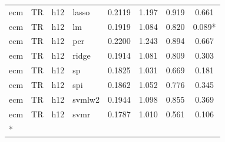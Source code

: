 \begin{ThreePartTable}
\begin{longtable}[t]{llclcccc}
ecm & TR & h12 & lasso & 0.2119 & 1.197 & 0.919 & 0.661\\
ecm & TR & h12 & lm & 0.1919 & 1.084 & 0.820 & 0.089*\\
ecm & TR & h12 & pcr & 0.2200 & 1.243 & 0.894 & 0.667\\
ecm & TR & h12 & ridge & 0.1914 & 1.081 & 0.809 & 0.303\\
ecm & TR & h12 & sp & 0.1825 & 1.031 & 0.669 & 0.181\\
ecm & TR & h12 & spi & 0.1862 & 1.052 & 0.776 & 0.345\\
ecm & TR & h12 & svmlw2 & 0.1944 & 1.098 & 0.855 & 0.369\\
ecm & TR & h12 & svmr & 0.1787 & 1.010 & 0.561 & 0.106\\*
\end{longtable}
\end{ThreePartTable}
\endgroup{}
